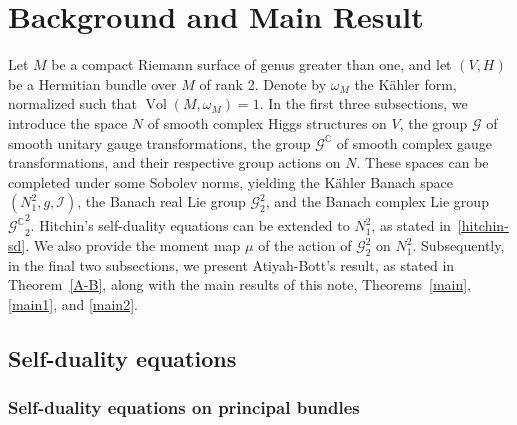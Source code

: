 \documentclass[a4paper]{amsart}
\theoremstyle{definition}
\theoremstyle{remark}
\numberwithin{equation}{section}
\begin{document}
\vspace{1cm}

\begin{figure}[omitted: a diagram of this paper's results, not reproduced here]\end{figure}

\vspace{1cm}

\section{Background and Main Result}

Let $M$ be a compact Riemann surface of genus greater than one, and let $(V, H)$ be a Hermitian bundle over $M$ of rank 2. Denote by $\omega_M$ the Kähler form, normalized such that $\operatorname{Vol}(M, \omega_M) = 1$. In the first three subsections, we introduce the space $N$ of smooth complex Higgs structures on $V$, the group $\mathscr{G}$ of smooth unitary gauge transformations, the group $\mathscr{G}^\mathbb{C}$ of smooth complex gauge transformations, and their respective group actions on $N$. These spaces can be completed under some Sobolev norms, 
yielding the Kähler Banach space $(N_1^2, g, \mathcal{I})$, the Banach real Lie group $\mathscr{G}_2^2$, and the Banach complex Lie group ${\mathscr{G}^\mathbb{C}}_2^2$. Hitchin's self-duality equations can be extended to $N_1^2$, as stated in~\eqref{hitchin-sd}. We also provide the moment map $\mu$ of the action of $\mathscr{G}_2^2$ on $N_1^2$. Subsequently, in the final two subsections, we present Atiyah-Bott's result, as stated in Theorem~\ref{A-B}, along with the main results of this note, Theorems~\ref{main}, \ref{main1}, and \ref{main2}.

\subsection{Self-duality equations}

\subsubsection{Self-duality equations on principal bundles}
\end{document}
